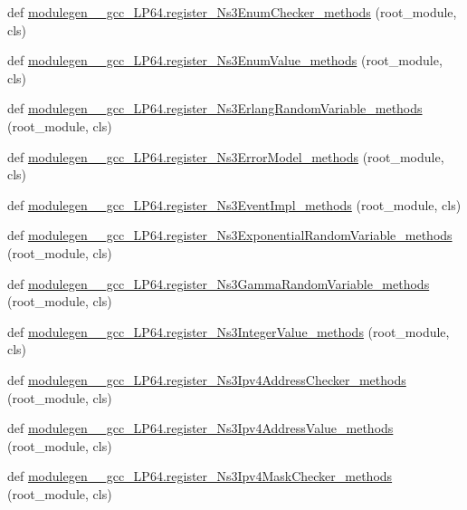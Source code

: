 \begin{DoxyCompactItemize}
\item 
def \hyperlink{namespacemodulegen____gcc__LP64_a85ff01ac79401b893725f8ef09197d8f}{modulegen\+\_\+\+\_\+gcc\+\_\+\+L\+P64.\+register\+\_\+\+Ns3\+Enum\+Checker\+\_\+methods} (root\+\_\+module, cls)
\item 
def \hyperlink{namespacemodulegen____gcc__LP64_a87d62ec8f015ce6b6fc14fcb3c75ca80}{modulegen\+\_\+\+\_\+gcc\+\_\+\+L\+P64.\+register\+\_\+\+Ns3\+Enum\+Value\+\_\+methods} (root\+\_\+module, cls)
\item 
def \hyperlink{namespacemodulegen____gcc__LP64_a7b3e5038bffbb5bc57da9d63ad434648}{modulegen\+\_\+\+\_\+gcc\+\_\+\+L\+P64.\+register\+\_\+\+Ns3\+Erlang\+Random\+Variable\+\_\+methods} (root\+\_\+module, cls)
\item 
def \hyperlink{namespacemodulegen____gcc__LP64_a74f0393544afcb97df64b9318fdf3798}{modulegen\+\_\+\+\_\+gcc\+\_\+\+L\+P64.\+register\+\_\+\+Ns3\+Error\+Model\+\_\+methods} (root\+\_\+module, cls)
\item 
def \hyperlink{namespacemodulegen____gcc__LP64_af4f20b1c5907e07b645fc3d57c733d1a}{modulegen\+\_\+\+\_\+gcc\+\_\+\+L\+P64.\+register\+\_\+\+Ns3\+Event\+Impl\+\_\+methods} (root\+\_\+module, cls)
\item 
def \hyperlink{namespacemodulegen____gcc__LP64_ab62699a984e734ed1c1a4081daa0111d}{modulegen\+\_\+\+\_\+gcc\+\_\+\+L\+P64.\+register\+\_\+\+Ns3\+Exponential\+Random\+Variable\+\_\+methods} (root\+\_\+module, cls)
\item 
def \hyperlink{namespacemodulegen____gcc__LP64_afc8093c1b272f8c4c4280ae9730cc32c}{modulegen\+\_\+\+\_\+gcc\+\_\+\+L\+P64.\+register\+\_\+\+Ns3\+Gamma\+Random\+Variable\+\_\+methods} (root\+\_\+module, cls)
\item 
def \hyperlink{namespacemodulegen____gcc__LP64_ab05afb2ecfb81af7b17cc3baf06fce54}{modulegen\+\_\+\+\_\+gcc\+\_\+\+L\+P64.\+register\+\_\+\+Ns3\+Integer\+Value\+\_\+methods} (root\+\_\+module, cls)
\item 
def \hyperlink{namespacemodulegen____gcc__LP64_adc0fd34fe5054bad708a40699ec19c68}{modulegen\+\_\+\+\_\+gcc\+\_\+\+L\+P64.\+register\+\_\+\+Ns3\+Ipv4\+Address\+Checker\+\_\+methods} (root\+\_\+module, cls)
\item 
def \hyperlink{namespacemodulegen____gcc__LP64_a790c617791e5a0c735de031e06684232}{modulegen\+\_\+\+\_\+gcc\+\_\+\+L\+P64.\+register\+\_\+\+Ns3\+Ipv4\+Address\+Value\+\_\+methods} (root\+\_\+module, cls)
\item 
def \hyperlink{namespacemodulegen____gcc__LP64_a2a6820145ab3bf977a66f5c0ee7f5cb9}{modulegen\+\_\+\+\_\+gcc\+\_\+\+L\+P64.\+register\+\_\+\+Ns3\+Ipv4\+Mask\+Checker\+\_\+methods} (root\+\_\+module, cls)

\end{DoxyCompactItemize}
